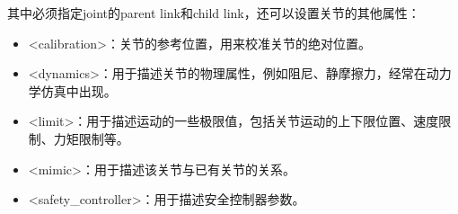 \documentclass[10pt, oneside]{book}
\begin{document}
其中必须指定joint的parent link和child link，还可以设置关节的其他属性：

\begin{itemize}
    \item <calibration>：关节的参考位置，用来校准关节的绝对位置。
    \item <dynamics>：用于描述关节的物理属性，例如阻尼、静摩擦力，经常在动力学仿真中出现。
    \item <limit>：用于描述运动的一些极限值，包括关节运动的上下限位置、速度限制、力矩限制等。
    \item <mimic>：用于描述该关节与已有关节的关系。
    \item <safety\_controller>：用于描述安全控制器参数。
\end{itemize}
\end{document}
